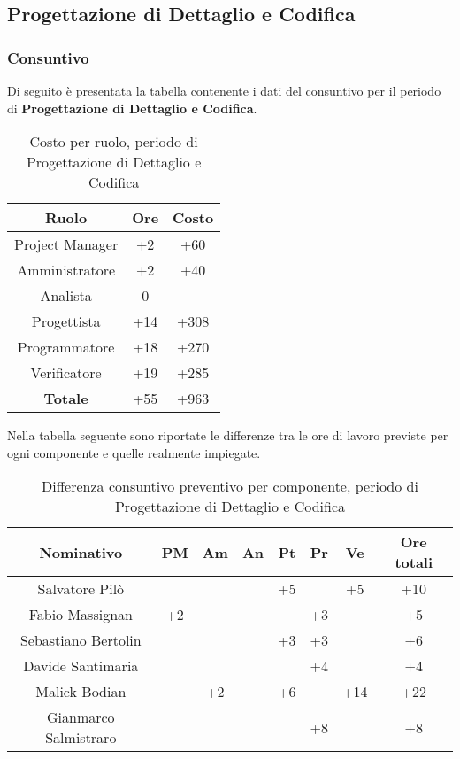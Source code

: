 \subsection{Progettazione di Dettaglio e Codifica}
		\subsubsection{Consuntivo}
		Di seguito è presentata la tabella contenente i dati del consuntivo per il periodo di \textbf{Progettazione di Dettaglio e Codifica}.
	\begin{table}[H]
		\centering
		\begin{tabular}{|c|c|c|}
			\hline
			\textbf{Ruolo}		& \textbf{Ore}	& \textbf{Costo} \\
			\hline
			Project Manager		& +2		& +60	\\
			Amministratore		& +2		& +40	\\
			Analista			& 0			&  \\
			Progettista			& +14		& +308	\\
			Programmatore		& +18		& +270	\\
			Verificatore		& +19		& +285	\\
			\hline
			\textbf{Totale}		& +55		& +963	\\
			\hline
		\end{tabular}
		\caption{Costo per ruolo, periodo di Progettazione di Dettaglio e Codifica}
	\end{table}
	Nella tabella seguente sono riportate le differenze tra le ore di lavoro previste per ogni componente e quelle realmente impiegate.
	\begin{table}[H]
		\centering
		\begin{tabular}{|c|c|c|c|c|c|c|c|}
			\hline
			\textbf{Nominativo}		& \textbf{PM}	& \textbf{Am}	& \textbf{An}	& \textbf{Pt}	& \textbf{Pr}	& \textbf{Ve}	& \textbf{Ore totali}     \\
			\hline
			Salvatore Pilò			& 		& 		& 		& +5	&		& +5	& +10 \\
			Fabio Massignan			& +2	& 		&		&		& +3	& 		& +5 \\
			Sebastiano Bertolin		&		& 	 	& 		& +3	& +3	&		& +6 \\
			Davide Santimaria		&		& 		&		&		& +4	& 		& +4 \\
			Malick Bodian			& 		& +2	& 		& +6	&		& +14	& +22 \\
			Gianmarco Salmistraro	&		&		& 	 	&		& +8	& 		& +8 \\
			\hline
		\end{tabular}
		\caption{Differenza consuntivo preventivo per componente, periodo di Progettazione di Dettaglio e Codifica}
	\end{table}
